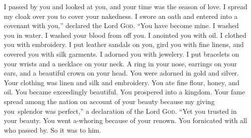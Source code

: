 
\begin{inparaenum}
     I passed by you and looked at you, and your time was the season of love. I spread my cloak over you to cover your nakedness. I swore an oath and entered into a covenant with you,'' declared the Lord \textsc{God}. ``You have become mine.%
     I washed you in water. I washed your blood from off you. I anointed you with oil.%
     I clothed you with embroidery. I put leather sandals on you, gird you with fine linens, and covered you with silk garments.%
     I adorned you with jewelery. I put bracelets on your wrists and a necklace on your neck.%
     A ring in your nose, earrings on your ears, and a beautiful crown on your head.%
     You were adorned in gold and silver. Your clothing was linen and silk and embroidery. You ate fine flour, honey, and oil. You became exceedingly beautiful. You prospered into a kingdom.%
     Your fame spread among the nation on account of your beauty because my giving you\understood\ splendor was perfect,'' a declaration of the Lord \textsc{God}.%
     ``Yet you trusted in your beauty. You went a-whoring because of your renown. You fornicated with all who passed by. So it was to him.%
    
    
    
\end{inparaenum}
